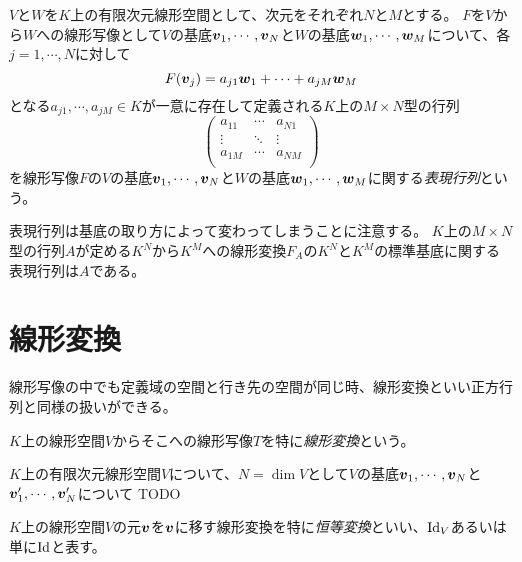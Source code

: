 \begin{definition}[表現行列]
$V$と$W$を$K$上の有限次元線形空間として、次元をそれぞれ$N$と$M$とする。
$F$を$V$から$W$への線形写像として$V$の基底$\vb*{v}_1, \cdots, \vb*{v}_N$と$W$の基底$\vb*{w}_1, \cdots, \vb*{w}_M$について、各$j = 1, \cdots, N$に対して
$$
F(\vb*{v}_j) = a_{j 1}\vb*{w}_1+\cdots+a_{j M}\vb*{w}_M
$$
となる$a_{j 1}, \cdots, a_{j M} \in K$が一意に存在して定義される$K$上の$M\times N$型の行列
$$
\begin{pmatrix}
a_{1 1} & \cdots & a_{N 1} \\
\vdots & \ddots & \vdots \\
a_{1 M} & \cdots & a_{N M} \\
\end{pmatrix}
$$
を線形写像$F$の$V$の基底$\vb*{v}_1, \cdots, \vb*{v}_N$と$W$の基底$\vb*{w}_1, \cdots, \vb*{w}_M$に関する\emph{表現行列}という。
\end{definition}

表現行列は基底の取り方によって変わってしまうことに注意する。
$K$上の$M\times N$型の行列$A$が定める$K^N$から$K^M$への線形変換$F_A$の$K^N$と$K^M$の標準基底に関する表現行列は$A$である。

\section{線形変換}

線形写像の中でも定義域の空間と行き先の空間が同じ時、線形変換といい正方行列と同様の扱いができる。

\begin{definition}[線形変換]
$K$上の線形空間$V$からそこへの線形写像$T$を特に\emph{線形変換}という。
\end{definition}

\begin{definition}[基底の変換]
$K$上の有限次元線形空間$V$について、$N = \dim V$として$V$の基底$\vb*{v}_1, \cdots, \vb*{v}_N$と$\vb*{v}'_1, \cdots, \vb*{v}'_N$について
TODO
\end{definition}

$K$上の線形空間$V$の元$\vb*{v}$を$\vb*{v}$に移す線形変換を特に\emph{恒等変換}といい、$\mathrm{Id}_V$あるいは単に$\mathrm{Id}$と表す。

